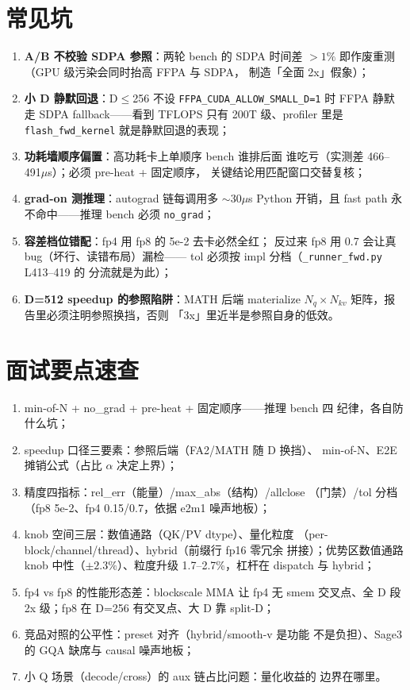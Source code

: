 \section{常见坑}

\begin{enumerate}[itemsep=0pt,topsep=2pt]
  \item \textbf{A/B 不校验 SDPA 参照}：两轮 bench 的 SDPA 时间差
        $>1\%$ 即作废重测（GPU 级污染会同时抬高 FFPA 与 SDPA，
        制造「全面 2x」假象）；
  \item \textbf{小 D 静默回退}：D$\le$256 不设
        \texttt{FFPA\_CUDA\_ALLOW\_SMALL\_D=1} 时 FFPA 静默走
        SDPA fallback——看到 TFLOPS 只有 200T 级、profiler 里是
        \texttt{flash\_fwd\_kernel} 就是静默回退的表现；
  \item \textbf{功耗墙顺序偏置}：高功耗卡上单顺序 bench 谁排后面
        谁吃亏（实测差 466--491$\mu$s）；必须 pre-heat + 固定顺序，
        关键结论用匹配窗口交替复核；
  \item \textbf{grad-on 测推理}：autograd 链每调用多 $\sim$30$\mu$s
        Python 开销，且 fast path 永不命中——推理 bench 必须
        \texttt{no\_grad}；
  \item \textbf{容差档位错配}：fp4 用 fp8 的 5e-2 去卡必然全红；
        反过来 fp8 用 0.7 会让真 bug（坏行、读错布局）漏检——
        tol 必须按 impl 分档（\texttt{\_runner\_fwd.py} L413--419 的
        分流就是为此）；
  \item \textbf{D=512 speedup 的参照陷阱}：MATH 后端 materialize
        $N_q\times N_{kv}$ 矩阵，报告里必须注明参照换挡，否则
        「3x」里近半是参照自身的低效。
\end{enumerate}

\section{面试要点速查}

\begin{enumerate}[itemsep=0pt,topsep=2pt]
  \item min-of-N + no\_grad + pre-heat + 固定顺序——推理 bench 四
        纪律，各自防什么坑；
  \item speedup 口径三要素：参照后端（FA2/MATH 随 D 换挡）、
        min-of-N、E2E 摊销公式（占比 $\alpha$ 决定上界）；
  \item 精度四指标：rel\_err（能量）/max\_abs（结构）/allclose
        （门禁）/tol 分档（fp8 5e-2、fp4 0.15/0.7，依据 e2m1
        噪声地板）；
  \item knob 空间三层：数值通路（QK/PV dtype）、量化粒度
        （per-block/channel/thread）、hybrid（前缀行 fp16 零冗余
        拼接）；优势区数值通路 knob 中性（$\pm2.3\%$）、粒度升级
        1.7--2.7\%，杠杆在 dispatch
        与 hybrid；
  \item fp4 vs fp8 的性能形态差：blockscale MMA 让 fp4 无 smem
        交叉点、全 D 段 2x 级；fp8 在 D=256 有交叉点、大 D 靠
        split-D；
  \item 竞品对照的公平性：preset 对齐（hybrid/smooth-v 是功能
        不是负担）、Sage3 的 GQA 缺席与 causal 噪声地板；
  \item 小 Q 场景（decode/cross）的 aux 链占比问题：量化收益的
        边界在哪里。
\end{enumerate}

